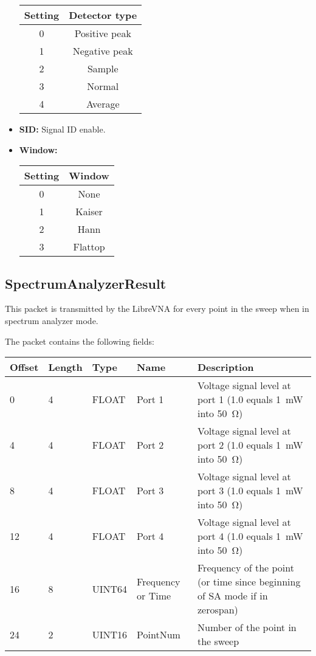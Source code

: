 \documentclass[a4paper,11pt]{article}
\begin{document}
\begin{itemize}
\begin{center}
\begin{tabular}{ c|c }
Setting & Detector type\\
 \hline
0 & Positive peak \\
1 & Negative peak \\
2 & Sample \\
3 & Normal \\
4 & Average \\
\end{tabular}
\end{center}
\item \textbf{SID:} Signal ID enable.
\item \textbf{Window:}
\begin{center}
\begin{tabular}{ c|c }
Setting & Window\\
 \hline
0 & None \\
1 & Kaiser\\
2 & Hann\\
3 & Flattop\\
\end{tabular}
\end{center}
\end{itemize}


\subsection{SpectrumAnalyzerResult}
This packet is transmitted by the LibreVNA for every point in the sweep when in spectrum analyzer mode.

The packet contains the following fields:
\begin{ThreePartTable}
\setlength\tabcolsep{3pt}

\begin{longtable}{p{} |  p{}  |  p{}| p{} | p{}}
\toprule
\textbf{Offset} &\textbf{Length} &\textbf{Type} & \textbf{Name} &\textbf{Description} \\ 
\hline
\endhead
\midrule[\heavyrulewidth]
\endfoot  
\midrule[\heavyrulewidth]
\endlastfoot

0 & 4 & FLOAT & Port 1 & Voltage signal level at port 1 (1.0 equals \SI{1}{\milli\watt} into \SI{50}{\ohm})\\
4 & 4 & FLOAT & Port 2 & Voltage signal level at port 2 (1.0 equals \SI{1}{\milli\watt} into \SI{50}{\ohm})\\
8 & 4 & FLOAT & Port 3 & Voltage signal level at port 3 (1.0 equals \SI{1}{\milli\watt} into \SI{50}{\ohm})\\
12 & 4 & FLOAT & Port 4 & Voltage signal level at port 4 (1.0 equals \SI{1}{\milli\watt} into \SI{50}{\ohm})\\
16 & 8 & UINT64 & Frequency or Time & Frequency of the point (or time since beginning of SA mode if in zerospan) \\
24 & 2 & UINT16 & PointNum & Number of the point in the sweep \\
\end{longtable}   
\end{ThreePartTable}
\end{document}

